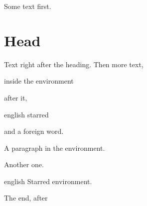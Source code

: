 \documentclass{article}
\begin{document}
Some text first.

\section{Head}
Text right after the heading. Then  more text,
\begin{otherlanguage}{english} inside the environment \end{otherlanguage} after it,
\begin{otherlanguage*}{english} starred \end{otherlanguage*} and a \foreignlanguage{english}{foreign} word.

\begin{otherlanguage}{english}
A paragraph in the environment.

Another one.
\end{otherlanguage}

\begin{otherlanguage*}{english}
Starred environment.
\end{otherlanguage*}
The end, after 
\end{document}
